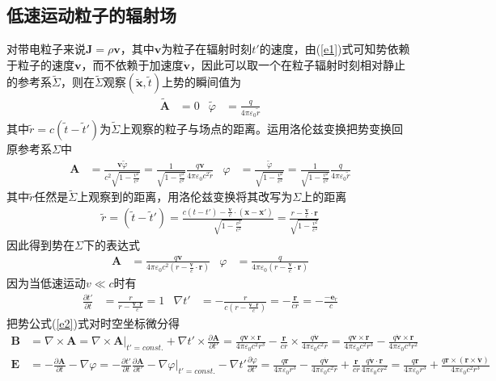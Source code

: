 \documentclass{article} %
\begin{document}
\subsection{低速运动粒子的辐射场}
对带电粒子来说$\pmb{J}=\rho \pmb{v}$，其中$\pmb{v}$为粒子在辐射时刻$t'$的速度，由(\ref{e1})式可知势依赖于粒子的速度$\pmb{v}$，而不依赖于加速度$\dot{\pmb{v}}$，因此可以取一个在粒子辐射时刻相对静止的参考系$\tilde{\Sigma}$，则在$\tilde{\Sigma}$观察$\left( \tilde{\pmb{x}},\tilde{t} \right)$上势的瞬间值为
\begin{align*}
  \tilde{\pmb{A}} & =0 & \tilde{\varphi} & =\frac{q}{4\pi\varepsilon_0 \tilde{r}}
\end{align*}
其中$\tilde{r}=c\left( \tilde{t}-\tilde{t}' \right)$为$\tilde{\Sigma}$上观察的粒子与场点的距离。运用洛伦兹变换把势变换回原参考系$\Sigma$中
\begin{align*}
  \pmb{A} & =\frac{\pmb{v}\tilde{\varphi}}{c^2\sqrt{1-\frac{v^2}{c^2}}} = \frac{1}{\sqrt{1-\frac{v^2}{c^2}}}\frac{q\pmb{v}}{4\pi\varepsilon_0 c^2\tilde{r}} & \varphi & =\frac{\tilde{\varphi}}{\sqrt{1-\frac{v^2}{c^2}}}=\frac{1}{\sqrt{1-\frac{v^2}{c^2}}}\frac{q}{4\pi\varepsilon_0 \tilde{r}}
\end{align*}
其中$\tilde{r}$任然是$\tilde{\Sigma}$上观察到的距离，用洛伦兹变换将其改写为$\Sigma$上的距离
\begin{align*}
  \tilde{r}=\left( \tilde{t}-\tilde{t}' \right)=\frac{c\left( t-t' \right)-\frac{\pmb{v}}{c}\cdot\left( \pmb{x}-\pmb{x}' \right)}{\sqrt{1-\frac{v^2}{c^2}}}=\frac{r-\frac{\pmb{v}}{c}\cdot \pmb{r}}{\sqrt{1-\frac{v^2}{c^2}}}
\end{align*}
因此得到势在$\Sigma$下的表达式
\begin{align}
  \pmb{A} & =\frac{q\pmb{v}}{4\pi\varepsilon_0 c^2 \left( r-\frac{\pmb{v}}{c}\cdot \pmb{r} \right)} & \varphi & =\frac{q}{4\pi\varepsilon_0 \left( r-\frac{\pmb{v}}{c}\cdot \pmb{r} \right)} \label{e2}
\end{align}
因为当低速运动$v\ll c$时有
\begin{align*}
  \frac{\partial t'}{\partial t} &=\frac{r}{r-\frac{\pmb{v}\cdot \pmb{r}}{c}}=1 & \nabla t'&=-\frac{r}{c\left( r-\frac{\pmb{v}\cdot \pmb{r}}{c} \right)}=-\frac{\pmb{r}}{cr}=-\frac{-\pmb{e}_r}{c}
\end{align*}
把势公式(\ref{e2})式对时空坐标微分得
\begin{align*}
  \pmb{B}&=\nabla \times \pmb{A}=\nabla \times \left. \pmb{A} \right|_{t'=const.}+\nabla t'\times \frac{\partial \pmb{A}}{\partial t'}=\frac{q\pmb{v}\times\pmb{r}}{4\pi\varepsilon_0 c^2 r^3}-\frac{\pmb{r}}{cr}\times\frac{q\dot{\pmb{v}}}{4\pi\varepsilon_0 c^2 r}=\frac{q\pmb{v}\times\pmb{r}}{4\pi\varepsilon_0 c^2 r^3}-\frac{q\dot{\pmb{v}}\times\pmb{r}}{4\pi\varepsilon_0 c^3 r^2}\\
  \pmb{E}&=-\frac{\partial \pmb{A}}{\partial t}-\nabla \varphi=-\frac{\partial t'}{\partial t}\frac{\partial \pmb{A}}{\partial t'}-\nabla \left. \varphi \right|_{t'=const.}-\nabla t'\frac{\partial \varphi}{\partial t'}=\frac{q{\pmb{r}}}{4\pi\varepsilon_0 r^3}-\frac{q\dot{\pmb{v}}}{4\pi\varepsilon_0 c^2 r}+\frac{\pmb{r}}{cr}\frac{q\dot{{\pmb{v}}}\cdot \pmb{r}}{4\pi\varepsilon_0 c r^2}=\frac{q{\pmb{r}}}{4\pi\varepsilon_0 r^3}+\frac{q\pmb{r}\times\left( \pmb{r}\times\dot{\pmb{v}} \right)}{4\pi\varepsilon_0 c^2 r^3}
\end{align*}
\end{document}
